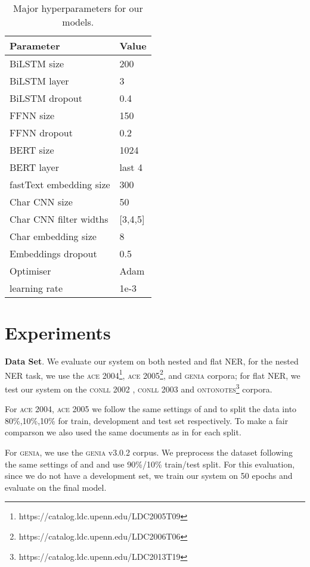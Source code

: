 \documentclass[11pt,a4paper]{article}
\newcommand{\ACRO}[1]{\textsc{#1}}
\newcommand{\GENIA}{\ACRO{genia}}
\newcommand{\ACEFOUR}{\ACRO{ace 2004}}
\newcommand{\ACEFIVE}{\ACRO{ace 2005}}
\newcommand{\CONLLTWO}{\ACRO{conll 2002}}
\newcommand{\CONLLTHREE}{\ACRO{conll 2003}}
\newcommand{\ONTONOTES}{\ACRO{ontonotes}}
\begin{document}
\begin{table}[t]
    \centering
    \begin{tabular}{l l}
    \toprule
    \bf Parameter & \bf Value \\
    \midrule
    BiLSTM size & 200\\
    BiLSTM layer &3\\
    BiLSTM dropout&0.4\\
    FFNN size&150\\
    FFNN dropout&0.2\\
    BERT size & 1024\\
    BERT layer&last 4\\
    fastText embedding size&300\\
    Char CNN size&50\\
    Char CNN filter widths&[3,4,5]\\
    Char embedding size&8\\
    Embeddings dropout &0.5\\
    Optimiser & Adam\\
    learning rate& 1e-3\\
    \bottomrule
    \end{tabular}
    \caption{Major hyperparameters for our models.}
    \label{tab:hyperparameters}
\end{table}

\section{Experiments}
\textbf{Data Set}. We evaluate our system on both nested and flat NER, for the nested NER task, we use the {\ACEFOUR}\footnote{https://catalog.ldc.upenn.edu/LDC2005T09}, {\ACEFIVE}\footnote{https://catalog.ldc.upenn.edu/LDC2006T06}, and  {\GENIA} \cite{kim2003genia} corpora; for flat NER, we test our system on the {\CONLLTWO} \cite{tjong-kim-sang-2002-introduction},
{\CONLLTHREE} \cite{tjong-kim-sang-de-meulder-conll2003-introduction} and  {\ONTONOTES}\footnote{https://catalog.ldc.upenn.edu/LDC2013T19} corpora.

For {\ACEFOUR}, {\ACEFIVE} we follow the same settings of  and  to split the data into 80\%,10\%,10\% for train, development and test set respectively. To make a fair comparson we also used the same documents as in  for each split.

For {\GENIA}, we use the {\GENIA} v3.0.2 corpus. We preprocess the dataset following the same settings of  and  and use 90\%/10\% train/test split. For this evaluation, since we do not have a development set, we train our system on 50 epochs and evaluate on the final model.
\end{document}
